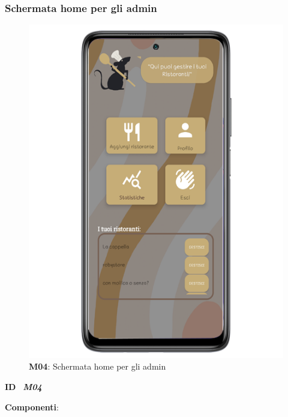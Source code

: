        \subsubsection{Schermata home per gli admin}
        \begin{figure}[H]
            \centering
            \includegraphics[scale=2]{assets/Mockup/Mockup_AdminDash.png}
            \caption{\textbf{M04}: Schermata home per gli admin}\label{fig:Mockup_AdminDashboard}
        \end{figure}
        \begin{flushleft}
            \textbf{ID} \ \Large{\textit{\textbf{M04}}} \\
        \end{flushleft}
        \textbf{Componenti}:

